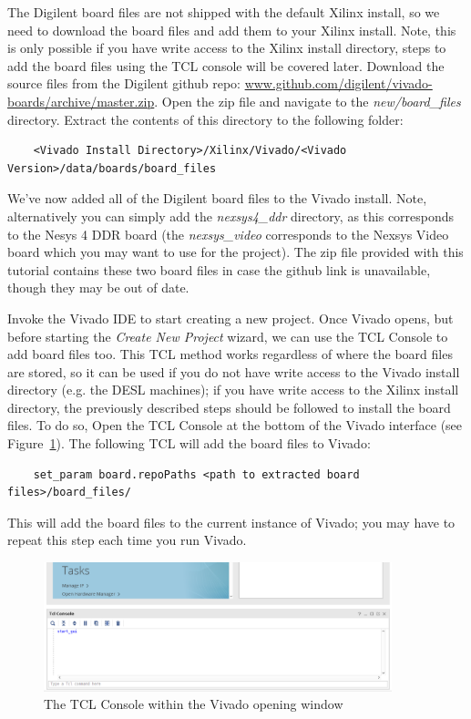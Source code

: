 \documentclass[11pt]{article}
\begin{document}
The Digilent board files are not shipped with the default Xilinx install, so we need to download the board files and add them to your Xilinx install. Note, this is only possible if you have write access to the Xilinx install directory, steps to add the board files using the TCL console will be covered later. Download the source files from the Digilent github repo:
\href{https://www.github.com/digilent/vivado-boards/archive/master.zip}{www.github.com/digilent/vivado-boards/archive/master.zip}. Open the zip file and navigate to the \textit{new/board\_files} directory. Extract the contents of this directory to the following folder:

\begin{verbatim}
    <Vivado Install Directory>/Xilinx/Vivado/<Vivado Version>/data/boards/board_files
\end{verbatim}

\noindent
We've now added all of the Digilent board files to the Vivado install. Note, alternatively you can simply add the \textit{nexsys4\_ddr} directory, as this corresponds to the Nesys 4 DDR board (the \textit{nexsys\_video} corresponds to the Nexsys Video board which you may want to use for the project). The zip file provided with this tutorial contains these two board files in case the github link is unavailable, though they may be out of date.

Invoke the Vivado IDE to start creating a new project. Once Vivado opens, but before starting the \textit{Create New Project} wizard, we can use the TCL Console to add board files too. This TCL method works regardless of where the board files are stored, so it can be used if you do not have write access to the Vivado install directory (e.g. the DESL machines); if you have write access to the Xilinx install directory, the previously described steps should be followed to install the board files. To do so, Open the TCL Console at the bottom of the Vivado interface (see Figure~\ref{fig:viv_tcl_con}). The following TCL will add the board files to Vivado:

\begin{verbatim}
    set_param board.repoPaths <path to extracted board files>/board_files/
\end{verbatim}

\noindent
This will add the board files to the current instance of Vivado; you may have to repeat this step each time you run Vivado.

\begin{figure}[!h]
    \centering
    \includegraphics[width=0.9\textwidth]{images/viv_tcl_con.png}
    \caption{The TCL Console within the Vivado opening window}
    \label{fig:viv_tcl_con}
\end{figure}
\end{document}

